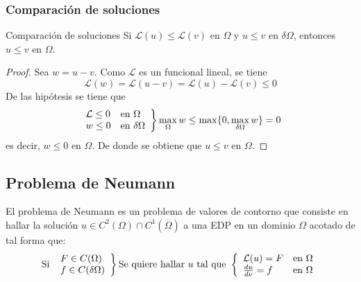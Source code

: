 \subsubsection{Comparación de soluciones}
\begin{prop}{Comparación de soluciones}
Si $\mathcal{L}(u) \le \mathcal{L}(v)$ en $\Omega$ y $u\le v$ en $\delta\Omega$, entonces $u\le v$ en $\Omega$.
\end{prop}
\begin{proof}
Sea $w = u-v$. 
Como $\mathcal{L}$ es un funcional lineal, se tiene
$$\mathcal{L}(w) = \mathcal{L}(u-v) = \mathcal{L}(u)-\mathcal{L}(v) \le 0$$
De las hipótesis se tiene que
\begin{equation*}
\left.
\begin{array}{l l}
\mathcal{L} \le 0 & \text{en } \Omega\\
w \le 0 & \text{en } \delta\Omega\\
\end{array}
\right\}
\max_{\Omega}w\le\max\{0,\max_{\delta\Omega}w\} = 0
\end{equation*}
es decir, $w \le 0$ en $\Omega$. De donde se obtiene que $u\le v$ en $\Omega$.
\end{proof}

\subsection{Problema de Neumann}
El problema de Neumann es un problema de valores de contorno que consiste en hallar la solución $u \in C^2(\Omega)\cap C^1(\overline{\Omega})$ a una EDP en un dominio $\Omega$ acotado de tal forma que:
\begin{equation*}
\text{Si }
\left.
\begin{array}{l}
F\in C(\Omega)\\
f\in C(\delta\Omega)
\end{array}
\right\}
\text{Se quiere hallar } u\text{ tal que }
\left\{
\begin{array}{l r}
\mathcal{L}(u) = F &\text{en } \Omega\\
\frac{du}{d\nu} = f &\text{en } \Omega\\
\end{array}
\right.
\end{equation*}

